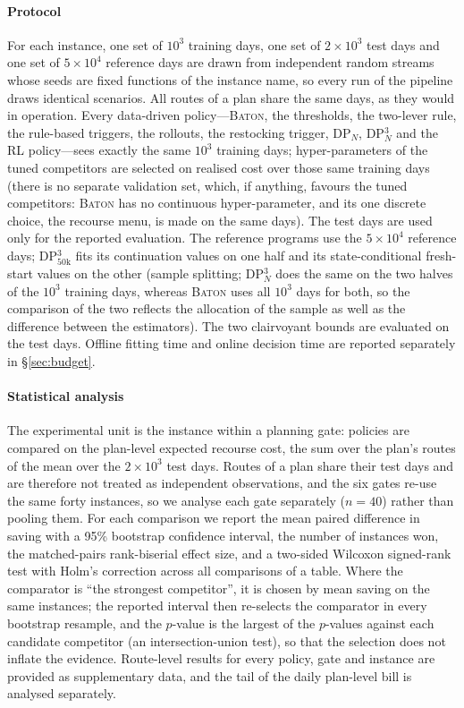 \documentclass[preprint,authoryear,12pt]{elsarticle}
\theoremstyle{definition}
\theoremstyle{remark}
\begin{document}
\paragraph{Protocol} For each instance, one set of $10^3$ training
days, one set of $2 \times 10^3$ test days and one set of
$5 \times 10^4$ reference days are drawn from independent random
streams whose seeds are fixed functions of the instance name, so every
run of the pipeline draws identical scenarios. All routes of a plan
share the same days, as they would in operation. Every data-driven
policy---\textsc{Baton}, the thresholds, the two-lever rule, the
rule-based triggers, the rollouts, the restocking trigger, DP$_N$,
DP$^3_N$ and the RL policy---sees exactly the same $10^3$ training days;
hyper-parameters of the tuned competitors are selected on realised cost
over those same training days (there is no separate validation set,
which, if anything, favours the tuned competitors: \textsc{Baton} has no
continuous hyper-parameter, and its one discrete choice, the recourse
menu, is made on the same days). The test days
are used only for the reported evaluation. The reference programs use
the $5 \times 10^4$ reference days; DP$^3_{50\mathrm{k}}$ fits its
continuation values on one half and its state-conditional fresh-start
values on the other (sample splitting; DP$^3_N$ does the same on the two
halves of the $10^3$ training days, whereas \textsc{Baton} uses all
$10^3$ days for both, so the comparison of the two reflects the
allocation of the sample as well as the difference between the
estimators).
The two clairvoyant bounds are evaluated on the test days. Offline fitting
time and online decision time are reported separately in
\S\ref{sec:budget}.

\paragraph{Statistical analysis} The experimental unit is the instance
within a planning gate: policies are compared on the plan-level expected
recourse cost, the sum over the plan's routes of the mean over the
$2 \times 10^3$ test days. Routes of a plan share their test days and
are therefore not treated as independent observations, and the six
gates re-use the same forty instances, so we analyse each gate
separately ($n = 40$) rather than pooling them. For each comparison we
report the mean paired difference in saving with a 95\% bootstrap
confidence interval, the number of instances won, the matched-pairs
rank-biserial effect size, and a two-sided Wilcoxon signed-rank test
with Holm's correction across all comparisons of a table. Where the
comparator is ``the strongest competitor'', it is chosen by mean saving
on the same instances; the reported interval then re-selects the
comparator in every bootstrap resample, and the $p$-value is the largest
of the $p$-values against each candidate competitor (an
intersection-union test), so that the selection does not inflate the
evidence. Route-level
results for every policy, gate and instance are provided as
supplementary data, and the tail of the daily plan-level bill is
analysed separately.
\end{document}
